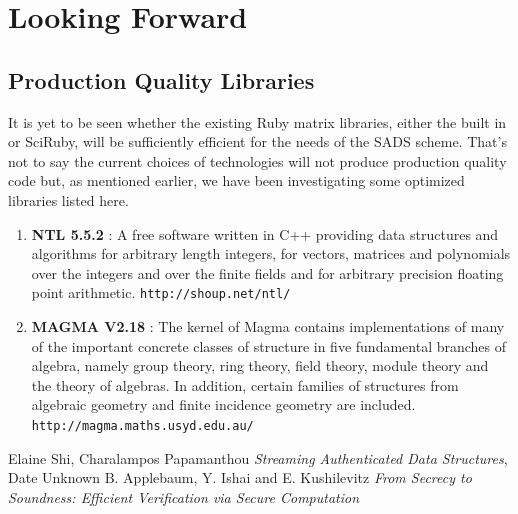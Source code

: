 \documentclass[11pt, letterpaper, oneside]{article}
\begin{document}
	
\section{Looking Forward}

	\subsection{Production Quality Libraries}
	It is yet to be seen whether the existing Ruby matrix libraries, either the built in or SciRuby, 
	will be sufficiently efficient for the needs of the SADS scheme. That's not to say the current 
	choices of technologies will not produce production quality code but, as mentioned earlier, we have
	been investigating some optimized libraries listed here.

	\begin{enumerate}
	\item \textbf{NTL 5.5.2} : A free software written in C++ providing data structures and algorithms for arbitrary length integers, for vectors, matrices and polynomials over the integers and over the finite fields and for arbitrary precision floating point arithmetic. \texttt{http://shoup.net/ntl/}
	\item \textbf{MAGMA V2.18} : The kernel of Magma contains implementations of many of the important concrete classes of structure in five fundamental branches of algebra, namely group theory, ring theory, field theory, module theory and the theory of algebras.
	In addition, certain families of structures from algebraic geometry and finite incidence geometry are included. \texttt{http://magma.maths.usyd.edu.au/}
	\end{enumerate}

	



\begin{thebibliography}{9}
	 Elaine Shi, Charalampos Papamanthou \emph{Streaming Authenticated Data Structures}, Date Unknown
	 B. Applebaum, Y. Ishai
and E. Kushilevitz \emph{From Secrecy to Soundness:
Efficient Verification via Secure Computation}
	\end{thebibliography}
\end{document}
